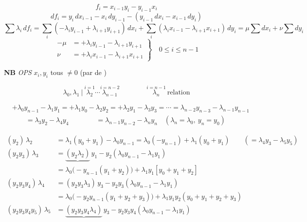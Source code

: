\documentclass[11pt,a4paper]{article}
\begin{document}
\[
f_i = x_{i-1} y_i - y_{i-1} x_i
\]
\[
df_i = y_i\, dx_{i-1} - x_i\, dy_{i-1} - (y_{i-1}\, dx_i - x_{i-1}\, dy_i)
\]
\[
\sum \lambda_i\, df_i = \sum_i (-\lambda_i y_{i-1} + \lambda_{i+1} y_{i+1})\,
dx_i + \sum_i (\lambda_i x_{i-1} - \lambda_{i+1} x_{i+1})\, dy_i
= \mu \sum dx_i + \nu \sum dy_i
\]
\[
\left.
\begin{aligned}
-\mu &= +\lambda_i y_{i-1} - \lambda_{i+1} y_{i+1} \\
\nu &= +\lambda_i x_{i-1} - \lambda_{i+1} x_{i+1}
\end{aligned}
\right\rbrace \quad 0 \leqslant i \leqslant n-1
\]

\textbf{NB} \emph{OPS} $x_i, y_i$ tous $\neq 0$ (par \ill{} de
)

\[
\lambda_0, \lambda_1 \ \big|\ \overset{i=1}{\lambda_2} \cdots
\overset{i=n-2}{\lambda_{n-1}} \qquad\qquad
\overset{i=n-1}{\lambda_n} \ \text{relation}
\]

\[
\begin{aligned}
&+\lambda_0 y_{n-1} - \lambda_1 y_1 = +\lambda_1 y_0 - \lambda_2 y_2
= +\lambda_2 y_1 - \lambda_3 y_3 = \cdots
= \lambda_{n-2} y_{n-3} - \lambda_{n-1} y_{n-1} \\
&\qquad = \lambda_3 y_2 - \lambda_4 y_4 \qquad\qquad
= \lambda_{n-1} y_{n-2} - \lambda_n y_n \quad
(\lambda_n = \lambda_0,\ y_n = y_0)
\end{aligned}
\]

\[
\begin{aligned}
(y_2)\,\lambda_2 &= \lambda_1 (y_0 + y_1) - \lambda_0 y_{n-1}
 = \lambda_0 (-y_{n-1}) + \lambda_1 (y_0 + y_1) \qquad
 (= \lambda_4 y_3 - \lambda_5 y_5) \\
(y_2 y_3)\,\lambda_3 &= \underbrace{(y_2 \lambda_2)}\, y_1
 - y_2 (\lambda_0 y_{n-1} - \lambda_1 y_1) \\
 &= \lambda_0 \bigl( -y_{n-1} (y_1 + y_2) \bigr)
 + \lambda_1 y_1 [y_0 + y_1 + y_2] \\
(y_2 y_3 y_4)\,\lambda_4 &= (y_2 y_3 \lambda_3)\, y_3
 - y_2 y_3 (\lambda_0 y_{n-1} - \lambda_1 y_1) \\
 &= \lambda_0 \bigl( -y_2 y_{n-1} (y_1 + y_2 + y_3) \bigr)
 + \lambda_1 y_1 y_2 (y_0 + y_1 + y_2 + y_3) \\
(y_2 y_3 y_4 y_5)\,\lambda_5 &= \underbrace{(y_2 y_3 y_4 \lambda_4)}\, y_3
 - y_2 y_3 y_4 (\lambda_0 y_{n-1} - \lambda_1 y_1)
\end{aligned}
\]
\end{document}
